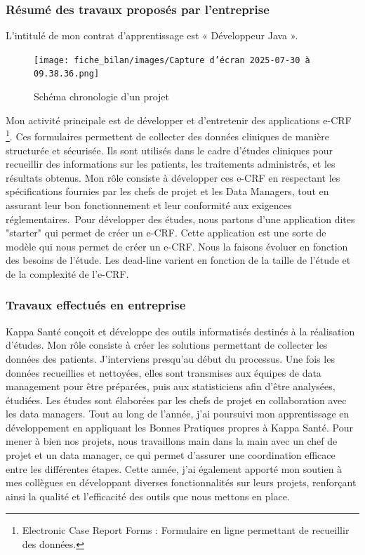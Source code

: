 \subsubsection{Résumé des travaux proposés par l'entreprise}
L'intitulé de mon contrat d'apprentissage est « Développeur Java ».
\begin{figure}[H]
    \centering
    \texttt{[image: fiche\_bilan/images/Capture d’écran 2025-07-30 à 09.38.36.png]} 
    \caption{Schéma chronologie d'un projet}
\end{figure}
Mon activité principale est de développer et d’entretenir des applications
 e-CRF \footnote{Electronic Case Report Forms : Formulaire en ligne permettant de recueillir des données.}. Ces formulaires permettent de collecter des données cliniques de manière structurée et sécurisée. Ils sont utilisés dans le cadre d'études cliniques pour recueillir des informations sur les patients, les traitements administrés, et les résultats obtenus. Mon rôle consiste à développer ces e-CRF en respectant les spécifications fournies par les chefs de projet et les Data Managers, tout en assurant leur bon fonctionnement et leur conformité aux exigences réglementaires.\
Pour développer des études, nous partons d'une application dites "starter" qui
permet de créer un e-CRF. Cette application est une sorte de modèle qui nous
permet de créer un e-CRF. Nous la faisons évoluer en fonction des
besoins de l'étude. Les dead-line varient en fonction de la taille de l'étude et de la
complexité de l'e-CRF. 
\subsubsection{Travaux effectués en entreprise}
Kappa Santé conçoit et développe des outils informatisés destinés à la réalisation d’études. Mon rôle consiste à créer les solutions permettant de collecter les données des patients. J’interviens presqu'au début du processus. Une fois les données recueillies et nettoyées, elles sont transmises aux équipes de data management pour être préparées, puis aux statisticiens afin d’être analysées, étudiées.
Les études sont élaborées par les chefs de projet en collaboration avec les data managers. Tout au long de l’année, j’ai poursuivi mon apprentissage en développement en appliquant les Bonnes Pratiques propres à Kappa Santé.
Pour mener à bien nos projets, nous travaillons main dans la main avec un chef de projet et un data manager, ce qui permet d’assurer une coordination efficace entre les différentes étapes. Cette année, j’ai également apporté mon soutien à mes collègues en développant diverses fonctionnalités sur leurs projets, renforçant ainsi la qualité et l’efficacité des outils que nous mettons en place.

